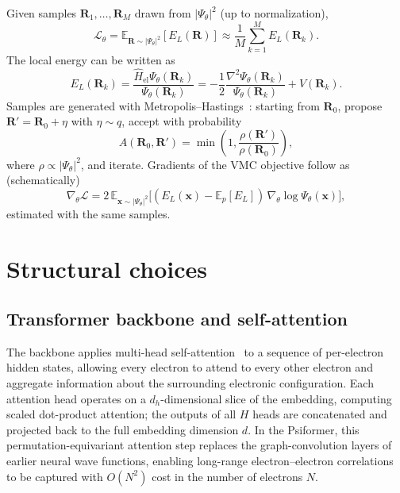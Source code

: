 Given samples $\mathbf{R}_1,\dots,\mathbf{R}_M$ drawn from $|\Psi_\theta|^2$ (up to normalization),
\begin{equation}
	\mathcal{L}_\theta
	=\mathbb{E}_{\mathbf{R}\sim |\Psi_\theta|^2}[E_L(\mathbf{R})]
	\approx \frac{1}{M}\sum_{k=1}^{M} E_L(\mathbf{R}_k).
\end{equation}
The local energy can be written as
\begin{equation}
	E_L(\mathbf{R}_k)
	=\frac{\hat{H}_{\text{el}}\Psi_\theta(\mathbf{R}_k)}{\Psi_\theta(\mathbf{R}_k)}
	=-\frac{1}{2}\frac{\nabla^{2}\Psi_\theta(\mathbf{R}_k)}{\Psi_\theta(\mathbf{R}_k)}+V(\mathbf{R}_k).
\end{equation}
Samples are generated with Metropolis--Hastings~\cite{metropolis}: starting from $\mathbf{R}_0$, propose $\mathbf{R}'=\mathbf{R}_0+\eta$ with $\eta\sim q$, accept with probability
\begin{equation}
	A(\mathbf{R}_0,\mathbf{R}')=\min\left(1,\frac{\rho(\mathbf{R}')}{\rho(\mathbf{R}_0)}\right),
\end{equation}
where $\rho\propto|\Psi_\theta|^2$, and iterate. Gradients of the VMC objective follow as (schematically)
\begin{equation}
	\nabla_{\theta}\mathcal{L}
	=2\,\mathbb{E}_{\mathbf{x}\sim |\Psi_\theta|^2}\bigl[(E_L(\mathbf{x})-\mathbb{E}_p[E_L])\,\nabla_\theta\log\Psi_\theta(\mathbf{x})\bigr],
\end{equation}
estimated with the same samples.

\section{Structural choices}

\subsection{Transformer backbone and self-attention}

The backbone applies multi-head self-attention~\cite{attention} to a sequence of per-electron hidden states, allowing every electron to attend to every other electron and aggregate information about the surrounding electronic configuration. Each attention head operates on a $d_h$-dimensional slice of the embedding, computing scaled dot-product attention; the outputs of all $H$ heads are concatenated and projected back to the full embedding dimension $d$. In the Psiformer, this permutation-equivariant attention step replaces the graph-convolution layers of earlier neural wave functions, enabling long-range electron--electron correlations to be captured with $O(N^2)$ cost in the number of electrons $N$.

